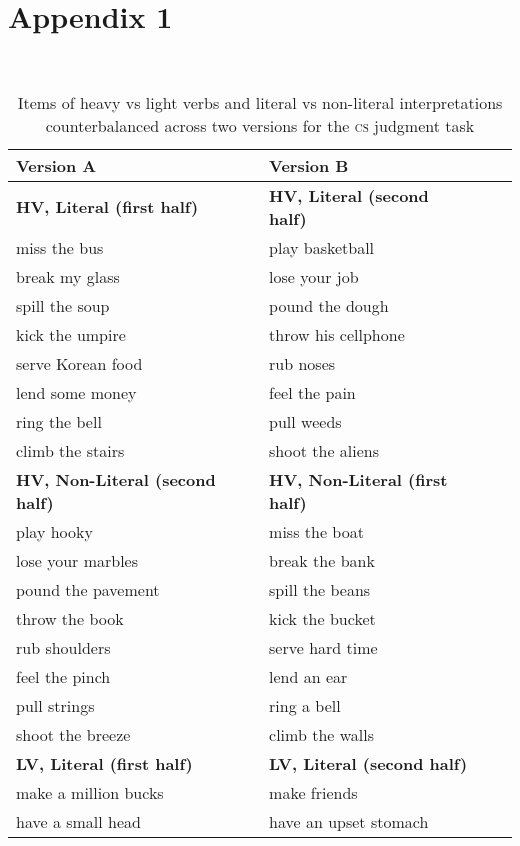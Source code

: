 \chapter{Appendix 1}

 \\


\begin{table}
\caption{Items of heavy vs light verbs and literal vs non-literal interpretations counterbalanced across two versions for the \textsc{cs} judgment task}
\label{tab:app1}
 \begin{tabular}{lllll} %
  \lsptoprule
              \textbf{Version A} &  & \textbf{Version B} \\ %
  \midrule
  \textbf{HV, Literal (first half)} &  & \textbf{HV, Literal (second half)}\\
 miss the bus	&   &	play basketball \\
break my glass	&   &	lose your job \\
spill the soup	&   &	pound the dough \\
kick the umpire	&   &	throw his cellphone \\ 
serve Korean food & &		rub noses  \\
lend some money	&   &	feel the pain \\
ring the bell	&   &	pull weeds \\
climb the stairs &  &	shoot the aliens \\ \midrule
\textbf{HV, Non-Literal (second half)} &  & \textbf{HV, Non-Literal (first half)} \\
play hooky	        &   &	miss the boat \\
lose your marbles	&   &	break the bank \\
pound the pavement  &   &		spill the beans \\
throw the book &    &		kick the bucket \\
rub shoulders & &		serve hard time \\
feel the pinch	&   &	lend an ear \\
pull strings	&   &	ring a bell \\ 
shoot the breeze &  &		climb the walls \\ \midrule
 \textbf{LV, Literal (first half)} &  & \textbf{LV, Literal (second half)} \\
 make a million bucks   &&		make friends \\
have a small head	&&	have an upset stomach \\

\end{tabular}
\end{table}
